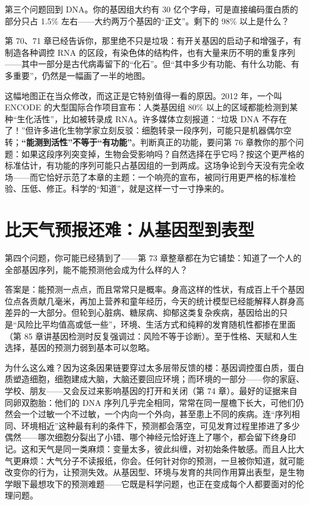 第三个问题回到 DNA。你的基因组大约有 30 亿个字母，可是直接编码蛋白质的部分只占 1.5\% 左右——大约两万个基因的“正文”。剩下的 98\% 以上是什么？

第 70、71 章已经告诉你，那里绝不只是垃圾：有开关基因的启动子和增强子，有制造各种调控 RNA 的区段，有染色体的结构件，也有大量来历不明的重复序列——其中一部分是古代病毒留下的“化石”。但“其中多少有功能、有什么功能、有多重要”，仍然是一幅画了一半的地图。

这幅地图正在当众修改，而这正是它特别值得一看的原因。2012 年，一个叫 ENCODE 的大型国际合作项目宣布：人类基因组 80\% 以上的区域都能检测到某种“生化活性”，比如被转录成 RNA。许多媒体立刻报道：“垃圾 DNA 不存在了！”但许多进化生物学家立刻反驳：细胞转录一段序列，可能只是机器偶尔空转；\textbf{“能测到活性”不等于“有功能”}。判断真正的功能，要问第 76 章教你的那个问题：如果这段序列突变掉，生物会受影响吗？自然选择在乎它吗？按这个更严格的标准估计，有功能的序列可能只占基因组的一到两成。这场争论到今天没有完全收场——而它恰好示范了本章的主题：一个响亮的宣布，被同行用更严格的标准检验、压低、修正。科学的“知道”，就是这样一寸一寸挣来的。

\section{比天气预报还难：从基因型到表型}

第四个问题，你可能已经猜到了——第 73 章整章都在为它铺垫：知道了一个人的全部基因序列，能不能预测他会成为什么样的人？

答案是：能预测一点点，而且常常只是概率。身高这样的性状，有成百上千个基因位点各贡献几毫米，再加上营养和童年经历，今天的统计模型已经能解释人群身高差异的一大部分。但轮到心脏病、糖尿病、抑郁这类复杂疾病，基因给出的只是“风险比平均值高或低一些”，环境、生活方式和纯粹的发育随机性都掺在里面（第 85 章讲基因检测时反复强调过：风险不等于诊断）。至于性格、天赋和人生选择，基因的预测力弱到基本可以忽略。

为什么这么难？因为这条因果链要穿过太多层带反馈的楼：基因调控蛋白质，蛋白质塑造细胞，细胞建成大脑，大脑还要回应环境；而环境的一部分——你的家庭、学校、朋友——又会反过来影响基因的打开和关闭（第 74 章）。最好的证据来自同卵双胞胎：他们的 DNA 序列几乎完全相同，常常在同一屋檐下长大，可他们仍然会一个过敏一个不过敏，一个内向一个外向，甚至患上不同的疾病。连“序列相同、环境相近”这种最有利的条件下，预测都会落空，可见发育过程里掺进了多少偶然——哪次细胞分裂出了小错、哪个神经元恰好连上了哪个，都会留下终身印记。这和天气是同一类麻烦：变量太多，彼此纠缠，对初始条件敏感。而且人比大气更麻烦：大气分子不读报纸，你会。任何针对你的预测，一旦被你知道，就可能改变你的行为，让预测失效。从基因型、环境与发育的共同作用算出表型，是生物学眼下最想攻下的预测难题——它既是科学问题，也正在变成每个人都要面对的伦理问题。

